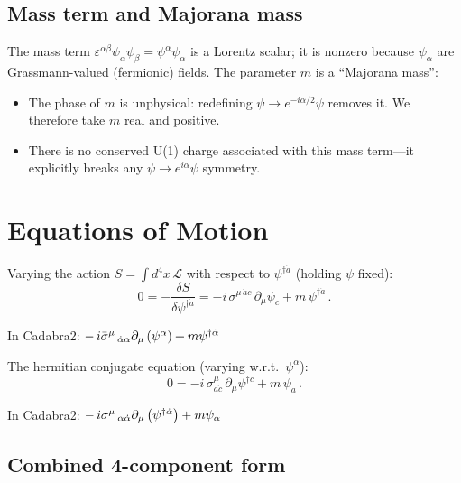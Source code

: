 \subsection{Mass term and Majorana mass}

The mass term $\varepsilon^{\alpha\beta}\psi_\alpha\psi_\beta = \psi^\alpha\psi_\alpha$
is a Lorentz scalar; it is nonzero because $\psi_\alpha$ are Grassmann-valued
(fermionic) fields.  The parameter $m$ is a ``Majorana mass'':
\begin{itemize}
  \item The phase of $m$ is unphysical: redefining $\psi \to e^{-i\alpha/2}\psi$
        removes it.  We therefore take $m$ real and positive.
  \item There is no conserved U(1) charge associated with this mass term---it
        explicitly breaks any $\psi\to e^{i\alpha}\psi$ symmetry.
\end{itemize}

\section{Equations of Motion}

Varying the action $S = \int d^4x\,\mathcal{L}$ with respect to
$\psi^{\dagger\dot{a}}$ (holding $\psi$ fixed):
\begin{equation}
  0 = -\frac{\delta S}{\delta\psi^{\dagger\dot{a}}}
    = -i\,\bar{\sigma}^{\mu\,\dot{a}c}\,\partial_\mu\psi_c
      + m\,\psi^{\dagger\dot{a}}\,.
  \tag{36.3--36.4}
\end{equation}

\noindent In Cadabra2: $-\,i \bar{\sigma}^{\mu}\,_{\dot{\alpha} \alpha} \partial_{\mu}\left(\psi^{\alpha}\right) + m \psi^{\dagger \dot{\alpha}}$

\medskip
\noindent The hermitian conjugate equation (varying w.r.t.\ $\psi^\alpha$):
\begin{equation}
  0 = -i\,\sigma^\mu_{a\dot{c}}\,\partial_\mu\psi^{\dagger\dot{c}}
      + m\,\psi_a\,.
  \tag{36.5}
\end{equation}

\noindent In Cadabra2: $-\,i \sigma^{\mu}\,_{\alpha \dot{\alpha}} \partial_{\mu}\left(\psi^{\dagger \dot{\alpha}}\right) + m \psi_{\alpha}$

\subsection{Combined 4-component form}

